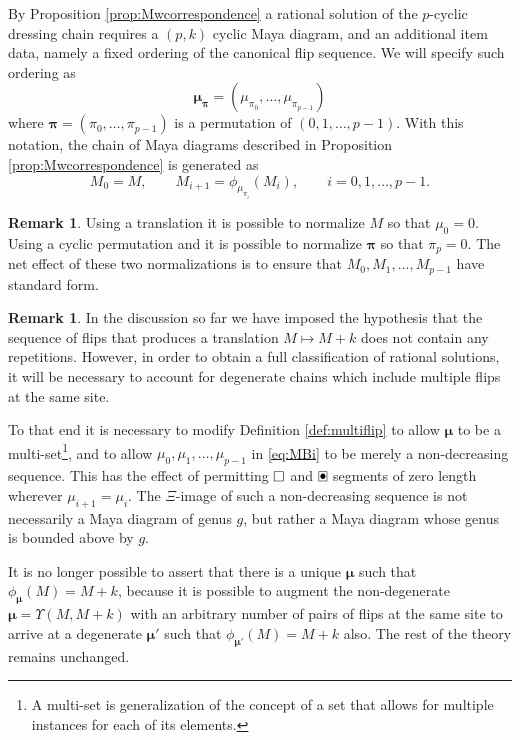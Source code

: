 \documentclass[10pt]{amsart}
\theoremstyle{definition}
\newtheorem{remark}[thm]{Remark}
\numberwithin{equation}{section}
\numberwithin{figure}{section}
\newcommand{\bmu}{{\boldsymbol{\mu}}}
\newcommand{\bpi}{{\boldsymbol{\pi}}}
\renewcommand{\boxdot}{{\ \clap{\raise0.25ex\hbox{$\bullet$}}\clap{$\square$}\ }}
\newcommand{\emptybox}{\hbox{$\square$}}
\begin{document}
By Proposition \ref{prop:Mwcorrespondence} a rational solution of the
$p$-cyclic dressing chain requires a $(p,k)$ cyclic Maya diagram, and
an additional item data, namely a fixed ordering of the canonical
flip sequence.
We will specify such ordering  as
\[ \bmu_\bpi = (\mu_{\pi_0},\ldots, \mu_{\pi_{p-1}}) \]
where $\bpi=(\pi_0,\ldots, \pi_{p-1})$ is a permutation of
$(0,1,\ldots, p-1)$. With this notation, the chain of Maya diagrams
described in Proposition \ref{prop:Mwcorrespondence}
is generated as
\begin{equation}\label{eq:picycle}
 M_0 = M,\qquad M_{i+1} =  \phi_{\mu_{\pi_i}}(M_i),\qquad i=0,1,\ldots, p-1.
 \end{equation}
\begin{remark}\label{rem:normalization}
Using a translation it is possible to normalize $M$ so that
$\mu_{0} = 0$.  Using a cyclic permutation and it is possible to
normalize $\bpi$ so that $\pi_p=0$.  The net effect of these two
normalizations is to ensure  that
$M_0,M_1,\ldots, M_{p-1}$ have standard form.
\end{remark}

\begin{remark}
In the discussion so far we have imposed the hypothesis that the
sequence of flips that produces a translation $M\mapsto M+k$ does not
contain any repetitions.  However, in order to obtain a full
classification of rational solutions, it will be necessary to account
for degenerate chains which include multiple flips at the same site.

To that end it is necessary to modify Definition \ref{def:multiflip}
to allow $\bmu$ to be a multi-set\footnote{A multi-set is
  generalization of the concept of a set that allows for multiple
  instances for each of its elements.}, and to allow
$\mu_0,\mu_1,\ldots, \mu_{p-1}$ in \eqref{eq:MBi} to be merely a
non-decreasing sequence.  
This has the effect of permitting $\emptybox$ and $\boxdot$ segments of
zero length wherever $\mu_{i+1} = \mu_i$.  The $\Xi$-image of such a
non-decreasing sequence is not necessarily a Maya diagram of genus
$g$, but rather a Maya diagram whose genus is bounded above by $g$.

It is no longer possible to assert that there is a unique $\bmu$ such
that $\phi_\bmu(M) = M+k$, because it is possible to augment the
non-degenerate $\bmu = \Upsilon(M,M+k)$ with an arbitrary number of
pairs of flips at the same site to arrive at a degenerate $\bmu'$ such
that $\phi_{\bmu'}(M) = M+k$ also.  The rest of the theory remains
unchanged.
\end{remark}
\end{document}
